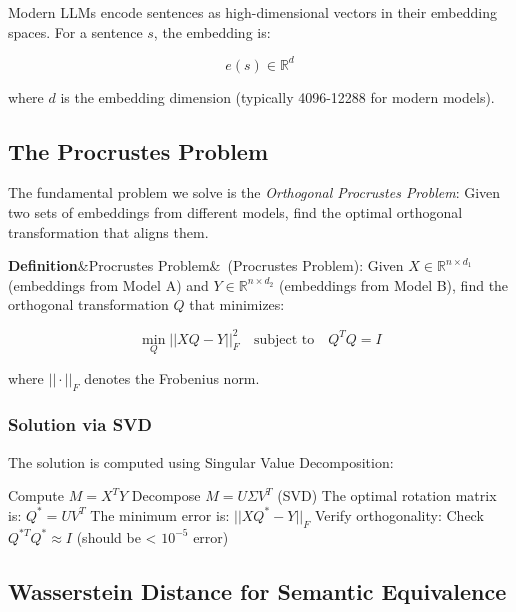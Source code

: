 \documentclass[12pt,a4paper,oneside]{report}
\newenvironment{definition}[1][]{\par\textbf{Definition}\ifx&#1&\else~(#1)\fi:\quad}{\par}
\begin{document}
Modern LLMs encode sentences as high-dimensional vectors in their embedding spaces. For a sentence $s$, the embedding is:

\begin{equation}
e(s) \in \mathbb{R}^d
\end{equation}

where $d$ is the embedding dimension (typically 4096-12288 for modern models).

\subsection{The Procrustes Problem}

The fundamental problem we solve is the \textit{Orthogonal Procrustes Problem}: Given two sets of embeddings from different models, find the optimal orthogonal transformation that aligns them.

\begin{definition}[Procrustes Problem]
Given $X \in \mathbb{R}^{n \times d_1}$ (embeddings from Model A) and $Y \in \mathbb{R}^{n \times d_2}$ (embeddings from Model B), find the orthogonal transformation $Q$ that minimizes:

\begin{equation}
\min_Q ||XQ - Y||_F^2 \quad \text{subject to} \quad Q^T Q = I
\end{equation}

where $||\cdot||_F$ denotes the Frobenius norm.
\end{definition}

\subsubsection{Solution via SVD}

The solution is computed using Singular Value Decomposition:

\begin{algorithm}
\caption{SVD-Based Procrustes Solver}
\begin{algorithmic}
\State Compute $M = X^T Y$
\State Decompose $M = U \Sigma V^T$ (SVD)
\State The optimal rotation matrix is: $Q^* = U V^T$
\State The minimum error is: $||XQ^* - Y||_F$
\State Verify orthogonality: Check $Q^{*T} Q^* \approx I$ (should be < $10^{-5}$ error)
\end{algorithmic}
\end{algorithm}

\subsection{Wasserstein Distance for Semantic Equivalence}
\end{document}
